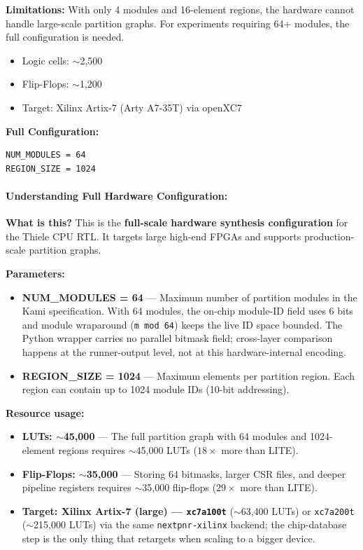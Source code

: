 \textbf{Limitations:} With only 4 modules and 16-element regions, the hardware cannot handle large-scale partition graphs. For experiments requiring 64+ modules, the full configuration is needed.

\begin{itemize}
    \item Logic cells: $\sim$2{,}500
    \item Flip-Flops: $\sim$1{,}200
    \item Target: Xilinx Artix-7 (Arty A7-35T) via openXC7
\end{itemize}

\textbf{Full Configuration:}
\begin{lstlisting}
NUM_MODULES = 64
REGION_SIZE = 1024
\end{lstlisting}

\paragraph{Understanding Full Hardware Configuration:}

\textbf{What is this?} This is the \textbf{full-scale hardware synthesis configuration} for the Thiele CPU RTL. It targets large high-end FPGAs and supports production-scale partition graphs.

\textbf{Parameters:}
\begin{itemize}
    \item \textbf{NUM\_MODULES = 64} — Maximum number of partition modules in the Kami specification. With 64 modules, the on-chip module-ID field uses 6 bits and module wraparound (\texttt{m mod 64}) keeps the live ID space bounded. The Python wrapper carries no parallel bitmask field; cross-layer comparison happens at the runner-output level, not at this hardware-internal encoding.
    \item \textbf{REGION\_SIZE = 1024} — Maximum elements per partition region. Each region can contain up to 1024 module IDs (10-bit addressing).
\end{itemize}

\textbf{Resource usage:}
\begin{itemize}
    \item \textbf{LUTs: $\sim$45,000} — The full partition graph with 64 modules and 1024-element regions requires $\sim$45,000 LUTs ($18\times$ more than LITE).
    \item \textbf{Flip-Flops: $\sim$35,000} — Storing 64 bitmasks, larger CSR files, and deeper pipeline registers requires $\sim$35,000 flip-flops ($29\times$ more than LITE).
    \item \textbf{Target: Xilinx Artix-7 (large) — \texttt{xc7a100t}} ($\sim$63{,}400 LUTs) or \texttt{xc7a200t} ($\sim$215{,}000 LUTs) via the same \texttt{nextpnr-xilinx} backend; the chip-database step is the only thing that retargets when scaling to a bigger device.
\end{itemize}

